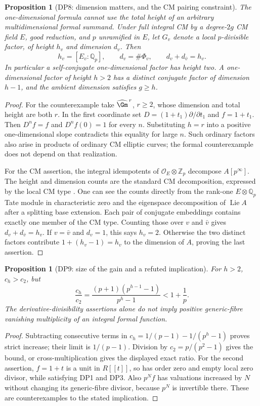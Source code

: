 \documentclass[11pt,a4paper]{article}
\newtheorem{proposition}[theorem]{Proposition}
\theoremstyle{definition}\newtheorem{remark}[theorem]{Remark}
\newcommand{\Z}{\mathbb Z}\newcommand{\Q}{\mathbb Q}\newcommand{\F}{\mathbb F}
\newcommand{\Lie}{\operatorname{Lie}}\newcommand{\Dist}{\operatorname{Dist}}
\begin{document}
\begin{proposition}[DP8: dimension matters, and the CM pairing constraint]\label{DP8}
The one-dimensional formula cannot use the total height of an arbitrary multidimensional formal summand. Under full integral CM by a degree-$2g$ CM field $E$, good reduction, and $p$ unramified in $E$, let $G_v$ denote a local $p$-divisible factor, of height $h_v$ and dimension $d_v$. Then
\[
 h_v=[E_v:\Q_p],\qquad d_v=\#\Phi_v,\qquad
 d_v+d_{\bar v}=h_v.
\]
In particular a self-conjugate one-dimensional factor has height two. A one-dimensional factor of height $h>2$ has a distinct conjugate factor of dimension $h-1$, and the ambient dimension satisfies $g\ge h$.
\end{proposition}
\begin{proof}
For the counterexample take $\widehat\Gm^{\,r}$, $r\ge2$, whose dimension and total height are both $r$. In the first coordinate set $D=(1+t_1)\partial/\partial t_1$ and $f=1+t_1$. Then $D^nf=f$ and $D^nf(0)=1$ for every $n$. Substituting $h=r$ into a positive one-dimensional slope contradicts this equality for large $n$. Such ordinary factors also arise in products of ordinary CM elliptic curves; the formal counterexample does not depend on that realization.

For the CM assertion, the integral idempotents of $\mathcal O_E\otimes\Z_p$ decompose $A[p^\infty]$. The height and dimension counts are the standard CM decomposition, expressed by the local CM type \cite[\S5, definition p.~106, (10*) and Theorem 3 p.~107]{Tate352}. One can see the counts directly from the rank-one $E\otimes\Q_p$ Tate module in characteristic zero and the eigenspace decomposition of $\Lie A$ after a splitting base extension. Each pair of conjugate embeddings contains exactly one member of the CM type. Counting those over $v$ and $\bar v$ gives $d_v+d_{\bar v}=h_v$. If $v=\bar v$ and $d_v=1$, this says $h_v=2$. Otherwise the two distinct factors contribute $1+(h_v-1)=h_v$ to the dimension of $A$, proving the last assertion.
\end{proof}

\begin{proposition}[DP9: size of the gain and a refuted implication]\label{DP9}
For $h>2$, $c_h>c_2$, but
\[
 \frac{c_h}{c_2}=\frac{(p+1)(p^{h-1}-1)}{p^h-1}<1+\frac1p.
\]
The derivative-divisibility assertions alone do not imply positive generic-fibre vanishing multiplicity of an integral formal function.
\end{proposition}
\begin{proof}
Subtracting consecutive terms in $c_h=1/(p-1)-1/(p^h-1)$ proves strict increase; their limit is $1/(p-1)$. Division by $c_2=p/(p^2-1)$ gives the bound, or cross-multiplication gives the displayed exact ratio. For the second assertion, $f=1+t$ is a unit in $R[[t]]$, so has order zero and empty local zero divisor, while satisfying DP1 and DP3. Also $p^Nf$ has valuations increased by $N$ without changing its generic-fibre divisor, because $p^N$ is invertible there. These are counterexamples to the stated implication.
\end{proof}
\end{document}
